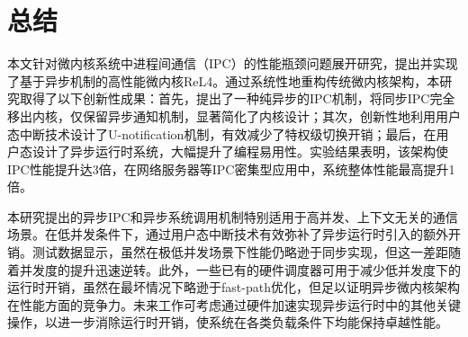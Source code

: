 \chapter{总结}
本文针对微内核系统中进程间通信（IPC）的性能瓶颈问题展开研究，提出并实现了基于异步机制的高性能微内核ReL4。通过系统性地重构传统微内核架构，本研究取得了以下创新性成果：首先，提出了一种纯异步的IPC机制，将同步IPC完全移出内核，仅保留异步通知机制，显著简化了内核设计；其次，创新性地利用用户态中断技术设计了U-notification机制，有效减少了特权级切换开销；最后，在用户态设计了异步运行时系统，大幅提升了编程易用性。实验结果表明，该架构使IPC性能提升达3倍，在网络服务器等IPC密集型应用中，系统整体性能最高提升1倍。

本研究提出的异步IPC和异步系统调用机制特别适用于高并发、上下文无关的通信场景。在低并发条件下，通过用户态中断技术有效弥补了异步运行时引入的额外开销。测试数据显示，虽然在极低并发场景下性能仍略逊于同步实现，但这一差距随着并发度的提升迅速逆转。此外，一些已有的硬件调度器可用于减少低并发度下的运行时开销，虽然在最坏情况下略逊于fast-path优化，但足以证明异步微内核架构在性能方面的竞争力。未来工作可考虑通过硬件加速实现异步运行时中的其他关键操作，以进一步消除运行时开销，使系统在各类负载条件下均能保持卓越性能。
